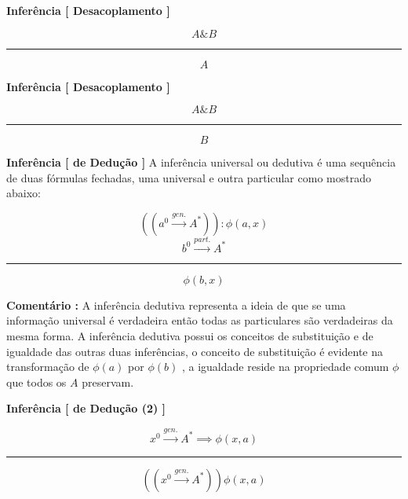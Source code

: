 \documentclass[10pt,a4paper]{report}
\begin{document}
\textbf{Inferência [ Desacoplamento ]} 

$$ A \& B $$
\hrule
$$ A $$

\textbf{Inferência [ Desacoplamento ]} 

$$ A \& B $$
\hrule
$$ B $$






\hspace{\baselineskip}

\textbf{Inferência [ de Dedução ]} A inferência universal ou dedutiva é uma sequência de duas fórmulas fechadas, uma universal e outra particular como mostrado abaixo:

$$ ((a^0 \overset{gen.}{\rightarrow} A^*)) : \phi(a,x) $$
$$ b^0 \overset{part.}{\rightarrow} A^* $$
\hrule
$$  \phi(b,x) $$

\textbf{Comentário :} A inferência dedutiva representa a ideia de que se uma informação universal é verdadeira então todas as particulares são verdadeiras da mesma forma. A inferência dedutiva possui os conceitos de substituição e de igualdade das outras duas inferências, o conceito de substituição é evidente na transformação de $\phi(a)$ por $\phi(b)$ , a igualdade reside na propriedade comum $\phi$ que todos os $A$ preservam.

\hspace{\baselineskip}

\textbf{Inferência [ de Dedução (2) ]} 

$$ x^0 \overset{gen.}{\rightarrow} A^* \implies \phi(x,a) $$
\hrule
$$ ((x^0 \overset{gen.}{\rightarrow} A^*)) \phi(x,a) $$


\end{document}
